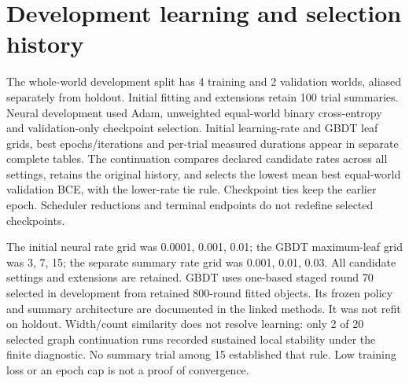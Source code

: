 \documentclass{article}
\begin{document}
\section{Development learning and selection history}

The whole-world development split has 4 training and 2 validation worlds, aliased separately from holdout. Initial fitting and extensions retain 100 trial summaries. Neural development used Adam, unweighted equal-world binary cross-entropy and validation-only checkpoint selection. Initial learning-rate and GBDT leaf grids, best epochs/iterations and per-trial measured durations appear in separate complete tables. The continuation compares declared candidate rates across all settings, retains the original history, and selects the lowest mean best equal-world validation BCE, with the lower-rate tie rule. Checkpoint ties keep the earlier epoch. Scheduler reductions and terminal endpoints do not redefine selected checkpoints.

\begin{center}
\end{center}


The initial neural rate grid was 0.0001, 0.001, 0.01; the GBDT maximum-leaf grid was 3, 7, 15; the separate summary rate grid was 0.001, 0.01, 0.03. All candidate settings and extensions are retained. GBDT uses one-based staged round 70 selected in development from retained 800-round fitted objects. Its frozen policy and summary architecture are documented in the linked methods. It was not refit on holdout. Width/count similarity does not resolve learning: only 2 of 20 selected graph continuation runs recorded sustained local stability under the finite diagnostic. No summary trial among 15 established that rule. Low training loss or an epoch cap is not a proof of convergence.
\end{document}
